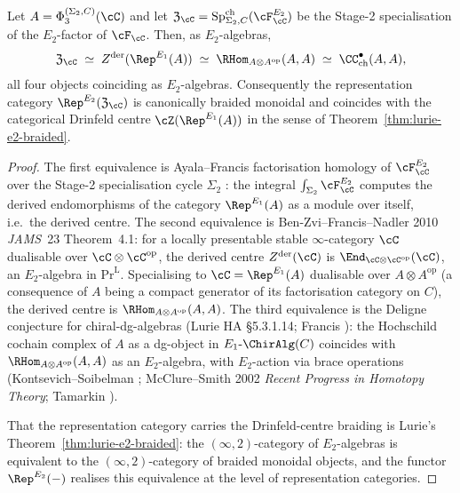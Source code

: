 \begin{theorem}
\label{thm:transverse-is-drinfeld-der}
Let $A = \Phi_3^{(\Sigma_2, C)}(\cC)$ and let $\fZ_\cC =
\mathrm{Sp}^{\mathrm{ch}}_{\Sigma_2, C}(\cF^{E_2}_\cC)$ be the Stage-2
specialisation of the $E_2$-factor of $\cF_\cC$. Then, as
$E_2$-algebras,
\[
 \fZ_\cC
 \;\simeq\;
 Z^{\mathrm{der}}(\Rep^{E_1}(A))
 \;\simeq\;
 \RHom_{A \otimes A^{\mathrm{op}}}(A, A)
 \;\simeq\;
 \CC^\bullet_{\mathrm{ch}}(A, A),
\]
all four objects coinciding as $E_2$-algebras. Consequently the
representation category $\Rep^{E_2}(\fZ_\cC)$ is canonically braided
monoidal and coincides with the categorical Drinfeld centre
$\cZ(\Rep^{E_1}(A))$ in the sense of
Theorem~\ref{thm:lurie-e2-braided}.
\end{theorem}

\begin{proof}
The first equivalence is Ayala--Francis factorisation homology of
$\cF^{E_2}_\cC$ over the Stage-2 specialisation cycle $\Sigma_2$
\cite[\S 3.1]{AyalaFrancis2015}: the integral
$\int_{\Sigma_2} \cF^{E_2}_\cC$ computes the derived endomorphisms of
the category $\Rep^{E_1}(A)$ as a module over itself, i.e.\ the
derived centre. The second equivalence is Ben-Zvi--Francis--Nadler
2010 \emph{JAMS}~23 Theorem~4.1: for a locally presentable stable
$\infty$-category $\cC$ dualisable over $\cC \otimes \cC^{\mathrm{op}}$,
the derived centre $Z^{\mathrm{der}}(\cC)$ is
$\End_{\cC \otimes \cC^{\mathrm{op}}}(\cC)$, an $E_2$-algebra in
$\mathrm{Pr}^{\mathrm L}$. Specialising to $\cC = \Rep^{E_1}(A)$
dualisable over $A \otimes A^{\mathrm{op}}$ (a consequence of
$A$ being a compact generator of its factorisation category on $C$),
the derived centre is $\RHom_{A \otimes A^{\mathrm{op}}}(A, A)$. The
third equivalence is the Deligne conjecture for chiral-dg-algebras
(Lurie HA \S 5.3.1.14; Francis \cite[\S 2]{Francis2013}): the
Hochschild cochain complex of $A$ as a dg-object in
$E_1\text{-}\ChirAlg(C)$ coincides with $\RHom_{A \otimes A^{\mathrm{op}}}
(A, A)$ as an $E_2$-algebra, with $E_2$-action via brace operations
(Kontsevich--Soibelman \cite{KontsevichSoibelmanDefI};
McClure--Smith 2002 \emph{Recent Progress in Homotopy Theory};
Tamarkin \cite{TamarkinDGCat}).

That the representation category carries the Drinfeld-centre braiding
is Lurie's Theorem~\ref{thm:lurie-e2-braided}: the
$(\infty, 2)$-category of $E_2$-algebras is equivalent to the
$(\infty, 2)$-category of braided monoidal objects, and the functor
$\Rep^{E_2}(-)$ realises this equivalence at the level of
representation categories.
\end{proof}

